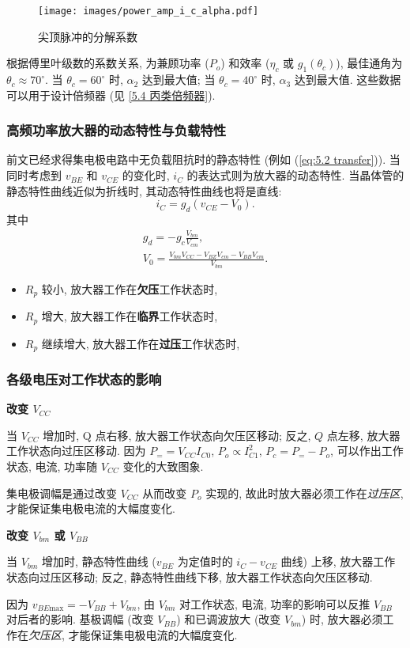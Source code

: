 \begin{figure}[H]
    \centering
    \texttt{[image: images/power\_amp\_i\_c\_alpha.pdf]}
    \caption{尖顶脉冲的分解系数}
    \label{fig:5.2 i C alpha}
\end{figure}

根据傅里叶级数的系数关系, 为兼顾功率 ($P_o$) 和效率 ($\eta_c$ 或 $g_1(\theta_c)$), 最佳通角为 $\theta_c\approx 70^\circ$. 当 $\theta_c=60^\circ$ 时, $\alpha_2$ 达到最大值; 当 $\theta_c=40^\circ$ 时, $\alpha_3$ 达到最大值. 这些数据可以用于设计倍频器 (见 \ref{5.4 丙类倍频器}).

\subsubsection{高频功率放大器的动态特性与负载特性}
前文已经求得集电极电路中无负载阻抗时的静态特性 (例如 (\ref{eq:5.2 transfer})). 当同时考虑到 $v_{BE}$ 和 $v_{CE}$ 的变化时, $i_C$ 的表达式则为放大器的动态特性. 当晶体管的静态特性曲线近似为折线时, 其动态特性曲线也将是直线:
\begin{equation}
    i_C=g_d(v_{CE}-V_0).
\end{equation}
其中
\begin{gather}
    g_d=-g_c\frac{V_{bm}}{V_{cm}}, \\
    V_0=\frac{V_{bm}V_{CC}-V_{BZ}V_{cm}-V_{BB}V_{cm}}{V_{bm}}.
\end{gather}

\begin{itemize}
    \item $R_p$ 较小, 放大器工作在\textbf{欠压}工作状态时,
    \item $R_p$ 增大, 放大器工作在\textbf{临界}工作状态时,
    \item $R_p$ 继续增大, 放大器工作在\textbf{过压}工作状态时,
\end{itemize}

\subsubsection{各级电压对工作状态的影响}
\textbf{改变 $V_{CC}$}

当 $V_{CC}$ 增加时, Q 点右移, 放大器工作状态向欠压区移动; 反之, $Q$ 点左移, 放大器工作状态向过压区移动. 因为 $P_==V_{CC}I_{C0}$, $P_o\propto I_{C1}^2$, $P_c=P_=-P_o$, 可以作出工作状态, 电流, 功率随 $V_{CC}$ 变化的大致图象.

集电极调幅是通过改变 $V_{CC}$ 从而改变 $P_o$ 实现的, 故此时放大器必须工作在\textit{过压区}, 才能保证集电极电流的大幅度变化.

\textbf{改变 $V_{bm}$ 或 $V_{BB}$}

当 $V_{bm}$ 增加时, 静态特性曲线 ($v_{BE}$ 为定值时的 $i_C-v_{CE}$ 曲线) 上移, 放大器工作状态向过压区移动; 反之, 静态特性曲线下移, 放大器工作状态向欠压区移动.

因为 $v_{BE\mathrm{max}}=-V_{BB}+V_{bm}$, 由 $V_{bm}$ 对工作状态, 电流, 功率的影响可以反推 $V_{BB}$ 对后者的影响. 基极调幅 (改变 $V_{BB}$) 和已调波放大 (改变 $V_{bm}$) 时, 放大器必须工作在\textit{欠压区}, 才能保证集电极电流的大幅度变化.
